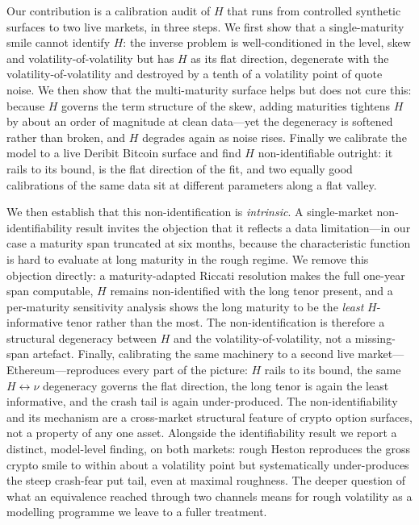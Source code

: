 \documentclass[11pt,a4paper]{article}
\numberwithin{equation}{section}
\begin{document}
Our contribution is a calibration audit of $H$ that runs from controlled synthetic surfaces to two
live markets, in three steps. We first show that a single-maturity smile cannot identify $H$: the
inverse problem is well-conditioned in the level, skew and volatility-of-volatility but has $H$ as
its flat direction, degenerate with the volatility-of-volatility and destroyed by a tenth of a
volatility point of quote noise. We then show that the multi-maturity surface helps but does not
cure this: because $H$ governs the term structure of the skew, adding maturities tightens $H$ by
about an order of magnitude at clean data---yet the degeneracy is softened rather than broken, and
$H$ degrades again as noise rises. Finally we calibrate the model to a live Deribit Bitcoin surface
and find $H$ non-identifiable outright: it rails to its bound, is the flat direction
of the fit, and two equally good calibrations of the same data sit at different parameters along a
flat valley.

We then establish that this non-identification is \emph{intrinsic}. A single-market
non-identifiability result invites the objection that it reflects a data limitation---in
our case a maturity span truncated at six months, because the characteristic function is
hard to evaluate at long maturity in the rough regime. We remove this objection directly:
a maturity-adapted Riccati resolution makes the full one-year span computable, $H$ remains
non-identified with the long tenor present, and a per-maturity sensitivity analysis shows
the long maturity to be the \emph{least} $H$-informative tenor rather than the most. The
non-identification is therefore a structural degeneracy between $H$ and the
volatility-of-volatility, not a missing-span artefact. Finally, calibrating the same
machinery to a second live market---Ethereum---reproduces every part of the picture: $H$
rails to its bound, the same $H\leftrightarrow\nu$ degeneracy governs the flat direction,
the long tenor is again the least informative, and the crash tail is again under-produced.
The non-identifiability and its mechanism are a cross-market structural feature of crypto
option surfaces, not a property of any one asset. Alongside the identifiability result we
report a distinct, model-level finding, on both markets: rough Heston reproduces the gross
crypto smile to within about a volatility point but systematically under-produces the steep
crash-fear put tail, even at maximal roughness. The deeper question of what an equivalence
reached through two channels means for rough volatility as a modelling programme we leave to
a fuller treatment.
\end{document}
